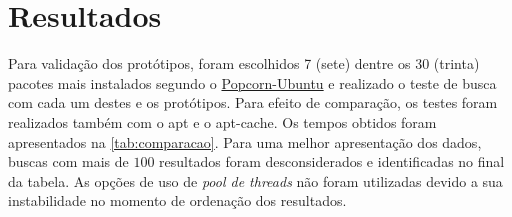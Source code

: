 \chapter{\nmu Resultados} %
\label{cha:resultados}

Para validação dos protótipos, foram escolhidos 7 (sete) dentre os 30 (trinta) pacotes mais instalados segundo o \href{http://popcon.ubuntu.com/}{Popcorn-Ubuntu} e realizado o teste de busca com cada um destes e os protótipos. Para efeito de comparação, os testes foram realizados também com o {\code apt} e o {\code apt-cache}. Os tempos obtidos foram apresentados na \autoref{tab:comparacao}. Para uma melhor apresentação dos dados, buscas com mais de $100$  resultados foram desconsiderados e identificadas no final da tabela. As opções de uso de \textit{pool de threads} não foram utilizadas devido a sua instabilidade no momento de ordenação dos resultados.

